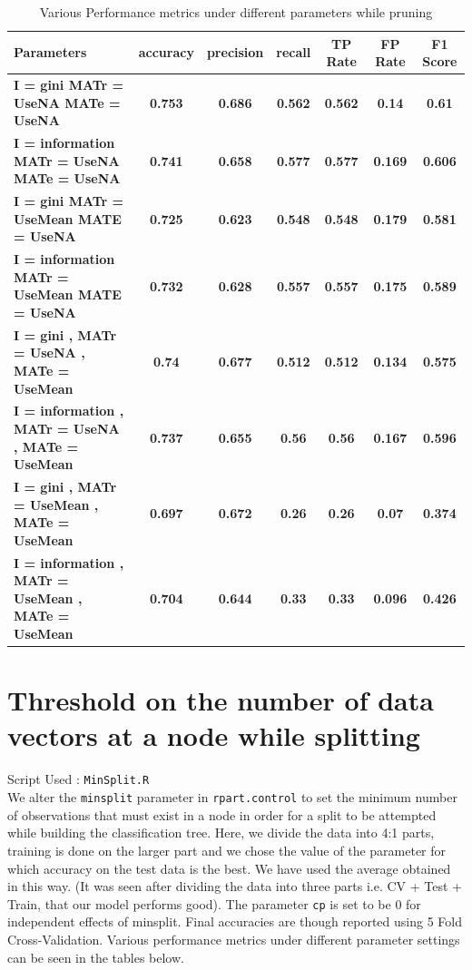 \documentclass[12pt]{article}%
\begin{document}
\begin{center}
\begin{table}
\centering
\label{table:prune}
\caption{Various Performance metrics under different parameters while pruning}
\begin{tabular}{|p{2in}|c|c|c|c|c|c|}
 \hline
 {\bf Parameters } & {\bf accuracy } & {\bf precision } & {\bf recall } & {\bf TP Rate } & {\bf FP Rate } & {\bf F1 Score } \\ \hline
 {\bf I = gini MATr = UseNA MATe = UseNA } & {\bf 0.753 } & {\bf 0.686 } & {\bf 0.562 } & {\bf 0.562 } & {\bf 0.14 } & {\bf 0.61 } \\ \hline
  {\bf I = information MATr = UseNA MATe = UseNA } & {\bf 0.741 } & {\bf 0.658 } & {\bf 0.577 } & {\bf 0.577 } & {\bf 0.169 } & {\bf 0.606 } \\ \hline
  {\bf I = gini MATr = UseMean MATE = UseNA}& {\bf 0.725 } & {\bf 0.623 } & {\bf 0.548 } & {\bf 0.548 } & {\bf 0.179 } & {\bf 0.581 } \\ \hline
  {\bf I = information MATr = UseMean MATE = UseNA} & {\bf 0.732 } & {\bf 0.628 } & {\bf 0.557 } & {\bf 0.557 } & {\bf 0.175 } & {\bf 0.589 } \\ \hline
{\bf I = gini , MATr = UseNA , MATe = UseMean  } & {\bf 0.74 } & {\bf 0.677 } & {\bf 0.512 } & {\bf 0.512 } & {\bf 0.134 } & {\bf 0.575 } \\ \hline
{\bf I = information , MATr = UseNA , MATe = UseMean  } & {\bf 0.737 } & {\bf 0.655 } & {\bf 0.56 } & {\bf 0.56 } & {\bf 0.167 } & {\bf 0.596 } \\ \hline
{\bf I = gini , MATr = UseMean , MATe = UseMean  } & {\bf 0.697 } & {\bf 0.672 } & {\bf 0.26 } & {\bf 0.26 } & {\bf 0.07 } & {\bf 0.374 } \\ \hline
{\bf I = information , MATr = UseMean , MATe = UseMean  } & {\bf 0.704 } & {\bf 0.644 } & {\bf 0.33 } & {\bf 0.33 } & {\bf 0.096 } & {\bf 0.426 } \\ \hline

\end{tabular}
\end{table}
\end{center}

\section{Threshold on the number of data vectors at a node while splitting}
Script Used : {\tt MinSplit.R} \\ 
We alter the {\tt minsplit} parameter in {\tt rpart.control} to set the minimum number of observations that must exist in a node in order for a split to be attempted while building the classification tree.
Here, we divide the data into 4:1 parts, training is done on the larger part and we chose the value of the parameter for which accuracy on the test data is the best. We have used the average obtained in this way. (It was seen after dividing the data into three parts i.e. CV +  Test +  Train, that our model performs good). The parameter {\tt cp} is set to be 0 for independent effects of minsplit.  Final accuracies are though reported using 5 Fold Cross-Validation. Various performance metrics under different parameter settings can be seen in the tables below.
\end{document}

